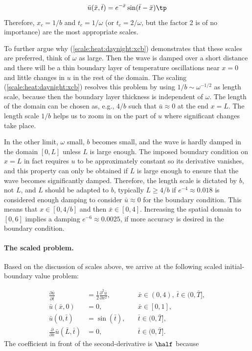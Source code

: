 \documentclass[graybox,envcountchap,sectrefs,final]{svmonodo}
\begin{document}
\begin{equation}
\bar u(\bar x, \bar t) = e^{-\bar x}\sin(\bar t - \bar x)\tp
\label{scale:heat:daynight:xcb}
\end{equation}
Therefore, $x_c=1/b$ and $t_c=1/\omega$ (or $t_c=2/\omega$, but the
factor 2 is of no importance) are the most appropriate scales.

To further argue why (\ref{scale:heat:daynight:xcb}) demonstrates
that these scales are
preferred, think of
$\omega$ as large. Then the wave is damped over a short
distance and there will be a thin boundary layer of temperature
oscillations near $x=0$ and little changes in $u$ in the rest of
the domain. The scaling (\ref{scale:heat:daynight:xcb}) resolves
this problem by using $1/b \sim \omega^{-1/2}$ as length scale,
because then the boundary layer thickness is independent of
$\omega$. The length of the domain can be chosen as, e.g., $4/b$
such that $\bar u\approx 0$ at the end $x=L$. The length scale $1/b$
helps us to zoom in on the part of $u$ where significant changes
take place.

In the other limit, $\omega$ small, $b$ becomes small, and the wave is
hardly damped in the domain $[0,L]$ unless $L$ is large enough.  The
imposed boundary condition on $x=L$ in fact requires $u$ to be
approximately constant so its derivative vanishes, and this property
can only be obtained if $L$ is large enough to ensure that the wave
becomes significantly damped.  Therefore, the length scale is dictated
by $b$, not $L$, and $L$ should be adapted to $b$, typically $L\geq
4/b$ if $e^{-4}\approx 0.018$ is considered enough damping to
consider $\bar u\approx 0$ for the boundary condition.
This means that $x\in [0,4/b]$ and then $\bar x\in [0,4]$.
Increasing the spatial domain to $[0,6]$ implies a damping $e^{-6}\approx
0.0025$, if more accuracy is desired in the boundary condition.

\paragraph{The scaled problem.}
Based on the discussion of scales above, we arrive at the following
scaled initial-boundary value problem:

\begin{align}
\frac{\partial \bar u}{\partial \bar t} &=
\frac{1}{2}\frac{\partial^2\bar u}{\partial x^2},
\quad & \bar x\in (0,4),\ \bar t\in (0,\bar T],
\label{scale:heat:pde2:d}\\ 
\bar u(\bar x,0) &= 0,
\quad &\bar x\in [0,1],
\label{scale:heat:pde2:ic:u:d}\\ 
\bar u(0,\bar t) & = \sin(\bar t),
\quad  &\bar t\in (0,\bar T],
\label{scale:heat:pde2:bc:0:d}\\ 
\frac{\partial}{\partial\bar x}\bar u(\bar L,\bar t) & = 0,
\quad &\bar t\in (0,\bar T].
\label{scale:heat:pde2:bc:L:d}
\end{align}
The coefficient in front of the second-derivative is $\half$ because
\end{document}
